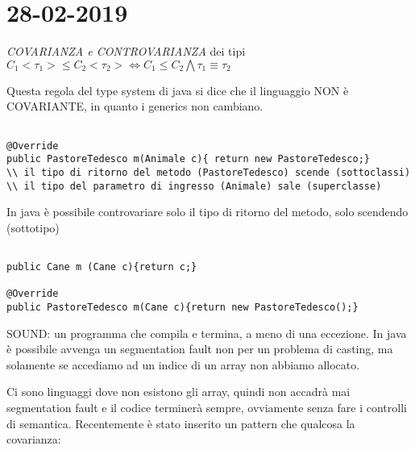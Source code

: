 

\newpage
\section{28-02-2019}
\par

\textit{COVARIANZA e CONTROVARIANZA} dei tipi \newline
$C_{1} <\tau_{1}> \leq C_{2}<\tau_{2}> \Leftrightarrow C_{1} \leq C_{2} \bigwedge \tau_{1}\equiv \tau_{2} $

Questa regola del type system di java si dice che il linguaggio NON è COVARIANTE, in quanto i generics non cambiano. \newline

\begin{lstlisting}[basicstyle=\small,]

@Override
public PastoreTedesco m(Animale c){ return new PastoreTedesco;}
\\ il tipo di ritorno del metodo (PastoreTedesco) scende (sottoclassi)
\\ il tipo del parametro di ingresso (Animale) sale (superclasse)

\end{lstlisting}

In java è possibile controvariare solo il tipo di ritorno del metodo, solo scendendo (sottotipo) \newline


\begin{lstlisting}[basicstyle=\small,]

public Cane m (Cane c){return c;}

@Override
public PastoreTedesco m(Cane c){return new PastoreTedesco();}

\end{lstlisting}


SOUND: un programma che compila e termina, a meno di una eccezione. \newline
In java è possibile avvenga un segmentation fault non per un problema di casting, ma solamente se accediamo ad un indice di un array non abbiamo allocato. \newline




Ci sono linguaggi dove non esistono gli array, quindi non accadrà mai segmentation fault e il codice terminerà sempre, ovviamente senza fare i controlli di semantica. \newline
Recentemente è stato inserito un pattern che qualcosa la covarianza: \newline


